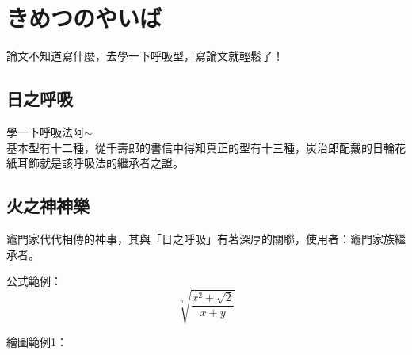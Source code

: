 \chapter{きめつのやいば}\label{structure}

論文不知道寫什麼，去學一下呼吸型，寫論文就輕鬆了！

\section{日之呼吸}
學一下呼吸法阿$\sim$ \\
基本型有十二種，從千壽郎的書信中得知真正的型有十三種，炭治郎配戴的日輪花紙耳飾就是該呼吸法的繼承者之證。

\section{火之神神樂}
竈門家代代相傳的神事，其與「日之呼吸」有著深厚的關聯，使用者：竈門家族繼承者。

公式範例：
\begin{equation}
   \sqrt[n]{\frac{x^2+\sqrt 2}{x+y}}
\end{equation}

繪圖範例1：
\begin{center}
   \pgfplotsset{width=8cm}          %
\end{center}
